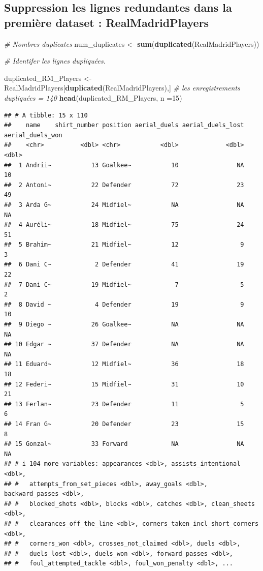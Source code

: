 \documentclass[
  6pt,
]{article}
\newenvironment{Shaded}{\begin{snugshade}}{\end{snugshade}}
\newcommand{\AttributeTok}[1]{\textcolor[rgb]{0.13,0.29,0.53}{#1}}
\newcommand{\CommentTok}[1]{\textcolor[rgb]{0.56,0.35,0.01}{\textit{#1}}}
\newcommand{\DecValTok}[1]{\textcolor[rgb]{0.00,0.00,0.81}{#1}}
\newcommand{\FunctionTok}[1]{\textcolor[rgb]{0.13,0.29,0.53}{\textbf{#1}}}
\newcommand{\NormalTok}[1]{#1}
\newcommand{\OtherTok}[1]{\textcolor[rgb]{0.56,0.35,0.01}{#1}}
\begin{document}
\subsection{Suppression les lignes redundantes dans la première dataset
:
RealMadridPlayers}\label{suppression-les-lignes-redundantes-dans-la-premiuxe8re-dataset-realmadridplayers}

\begin{Shaded}
\begin{Highlighting}[]
\CommentTok{\# Nombres duplicates}
\NormalTok{num\_duplicates }\OtherTok{\textless{}{-}} \FunctionTok{sum}\NormalTok{(}\FunctionTok{duplicated}\NormalTok{(RealMadridPlayers))}

\CommentTok{\# Identifer les lignes dupliquées. }

\NormalTok{duplicated\_RM\_Players }\OtherTok{\textless{}{-}}\NormalTok{ RealMadridPlayers[}\FunctionTok{duplicated}\NormalTok{(RealMadridPlayers),]}
\CommentTok{\# les enregistrements dupliquées = 140}
\FunctionTok{head}\NormalTok{(duplicated\_RM\_Players, }\AttributeTok{n =}\DecValTok{15}\NormalTok{)}
\end{Highlighting}
\end{Shaded}

\begin{verbatim}
## # A tibble: 15 x 110
##    name    shirt_number position aerial_duels aerial_duels_lost aerial_duels_won
##    <chr>          <dbl> <chr>           <dbl>             <dbl>            <dbl>
##  1 Andrii~           13 Goalkee~           10                NA               10
##  2 Antoni~           22 Defender           72                23               49
##  3 Arda G~           24 Midfiel~           NA                NA               NA
##  4 Auréli~           18 Midfiel~           75                24               51
##  5 Brahim~           21 Midfiel~           12                 9                3
##  6 Dani C~            2 Defender           41                19               22
##  7 Dani C~           19 Midfiel~            7                 5                2
##  8 David ~            4 Defender           19                 9               10
##  9 Diego ~           26 Goalkee~           NA                NA               NA
## 10 Edgar ~           37 Defender           NA                NA               NA
## 11 Eduard~           12 Midfiel~           36                18               18
## 12 Federi~           15 Midfiel~           31                10               21
## 13 Ferlan~           23 Defender           11                 5                6
## 14 Fran G~           20 Defender           23                15                8
## 15 Gonzal~           33 Forward            NA                NA               NA
## # i 104 more variables: appearances <dbl>, assists_intentional <dbl>,
## #   attempts_from_set_pieces <dbl>, away_goals <dbl>, backward_passes <dbl>,
## #   blocked_shots <dbl>, blocks <dbl>, catches <dbl>, clean_sheets <dbl>,
## #   clearances_off_the_line <dbl>, corners_taken_incl_short_corners <dbl>,
## #   corners_won <dbl>, crosses_not_claimed <dbl>, duels <dbl>,
## #   duels_lost <dbl>, duels_won <dbl>, forward_passes <dbl>,
## #   foul_attempted_tackle <dbl>, foul_won_penalty <dbl>, ...
\end{verbatim}
\end{document}

